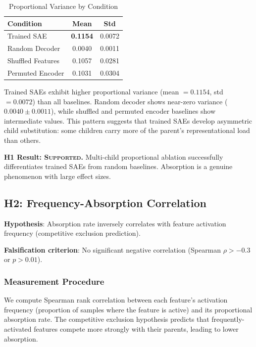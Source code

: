 \documentclass{article}
\begin{document}
\begin{table}[t]
\caption{Proportional Variance by Condition}
\label{tab:prop_variance}
\centering
\begin{tabular}{lcc}
\toprule
Condition & Mean & Std \\
\midrule
Trained SAE & \textbf{0.1154} & 0.0072 \\
Random Decoder & 0.0040 & 0.0011 \\
Shuffled Features & 0.1057 & 0.0281 \\
Permuted Encoder & 0.1031 & 0.0304 \\
\bottomrule
\end{tabular}
\end{table}

Trained SAEs exhibit higher proportional variance (mean $= 0.1154$, std $= 0.0072$) than all baselines. Random decoder shows near-zero variance ($0.0040 \pm 0.0011$), while shuffled and permuted encoder baselines show intermediate values. This pattern suggests that trained SAEs develop asymmetric child substitution: some children carry more of the parent's representational load than others.

\textbf{H1 Result: \textsc{Supported}.} Multi-child proportional ablation successfully differentiates trained SAEs from random baselines. Absorption is a genuine phenomenon with large effect sizes.

\subsection{H2: Frequency-Absorption Correlation}

\textbf{Hypothesis}: Absorption rate inversely correlates with feature activation frequency (competitive exclusion prediction).

\textbf{Falsification criterion}: No significant negative correlation (Spearman $\rho > -0.3$ or $p > 0.01$).

\subsubsection{Measurement Procedure}

We compute Spearman rank correlation between each feature's activation frequency (proportion of samples where the feature is active) and its proportional absorption rate. The competitive exclusion hypothesis predicts that frequently-activated features compete more strongly with their parents, leading to lower absorption.
\end{document}
